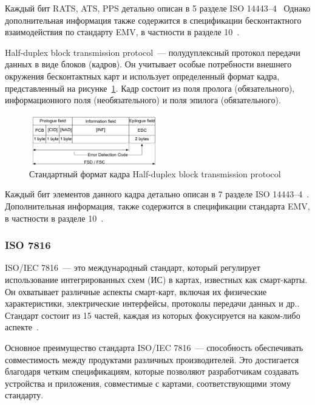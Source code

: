 Каждый бит RATS, ATS, PPS детально описан в 5 разделе ISO 14443--4~\cite{iso14443-4} Однако дополнительная информация также содержится в спецификации бесконтактного взаимодействия по стандарту EMV, в частности в разделе 10~\cite{emv_specifications_book}.

Half-duplex block transmission protocol~--- полудуплексный протокол передачи данных в виде блоков (кадров).
Он учитывает особые потребности внешнего окружения бесконтактных карт и использует определенный формат кадра, представленный на рисунке~\ref{fig:hd_block_format}.
Кадр состоит из поля пролога (обязательного), информационного поля (необязательного) и поля эпилога (обязательного).

\begin{figure}[H]
    \centering
    \includegraphics[width=0.5\textwidth]{images/research/hd_block_format}
    \caption{\centering Стандартный формат кадра Half-duplex block transmission protocol}
    \label{fig:hd_block_format}
\end{figure}

Каждый бит элементов данного кадра детально описан в 7 разделе ISO 14443--4~\cite{iso14443-4}.
Дополнительная информация, также содержится в спецификации стандарта EMV, в частности в разделе 10~\cite{emv_specifications_book}.


\subsubsection{ISO 7816}
\label{subsubsec:7816}

ISO/IEC 7816~--- это международный стандарт, который регулирует использование интегрированных схем (ИС) в картах, известных как смарт-карты.
Он охватывает различные аспекты смарт-карт, включая их физические характеристики, электрические интерфейсы, протоколы передачи данных и др..
Стандарт состоит из 15 частей, каждая из которых фокусируется на каком-либо аспекте~\cite{7816_wiki}.

Основное преимущество стандарта ISO/IEC 7816~--- способность обеспечивать совместимость между продуктами различных производителей.
Это достигается благодаря четким спецификациям, которые позволяют разработчикам создавать устройства и приложения, совместимые с картами, соответствующими этому стандарту.

